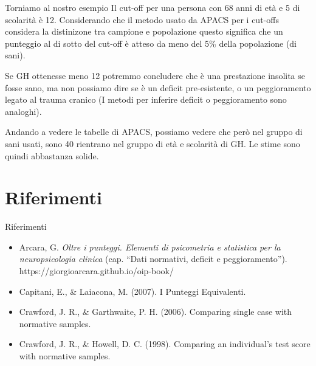 \documentclass[
  ignorenonframetext,
  aspectratio=169,
]{beamer}
\providecommand{\tightlist}{%
  \setlength{\itemsep}{0pt}\setlength{\parskip}{0pt}}
\begin{document}
\begin{frame}{Torniamo al nostro esempio}
\label{torniamo-al-nostro-esempio-2}
Il cut-off per una persona con 68 anni di età e 5 di scolarità è 12.
Considerando che il metodo usato da APACS per i cut-offs considera la
distinizone tra campione e popolazione questo significa che un punteggio
al di sotto del cut-off è atteso da meno del 5\% della popolazione (di
sani).

Se GH ottenesse meno 12 potremmo concludere che è una prestazione
insolita se fosse sano, ma non possiamo dire se è un deficit
pre-esistente, o un peggioramento legato al trauma cranico (I metodi per
inferire deficit o peggioramento sono analoghi).

Andando a vedere le tabelle di APACS, possiamo vedere che però nel
gruppo di sani usati, sono 40 rientrano nel gruppo di età e scolarità di
GH. Le stime sono quindi abbastanza solide.
\end{frame}

\section{Riferimenti}\label{riferimenti}

\begin{frame}{Riferimenti}
\label{riferimenti-1}
\footnotesize

\begin{itemize}
\tightlist
\item
  Arcara, G. \emph{Oltre i punteggi. Elementi di psicometria e
  statistica per la neuropsicologia clinica} (cap. ``Dati normativi,
  deficit e peggioramento''). https://giorgioarcara.github.io/oip-book/
\item
  Capitani, E., \& Laiacona, M. (2007). I Punteggi Equivalenti.
\item
  Crawford, J. R., \& Garthwaite, P. H. (2006). Comparing single case
  with normative samples.
\item
  Crawford, J. R., \& Howell, D. C. (1998). Comparing an individual's
  test score with normative samples.
\end{itemize}
\end{frame}
\end{document}
